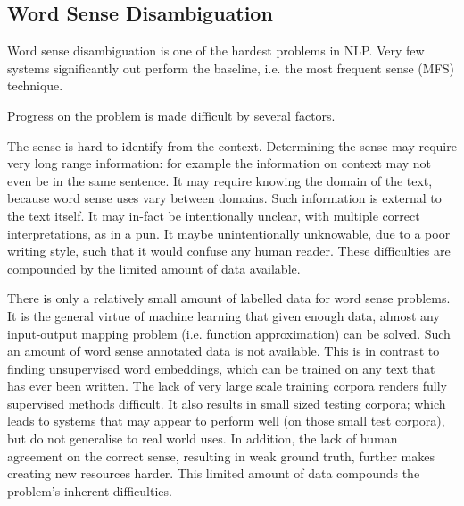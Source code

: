 \documentclass[12pt,parskip]{komatufte}
\begin{document}
\begin{figure}
{}
	
	
\end{figure}



\subsection{Word Sense Disambiguation}
Word sense disambiguation is one of the hardest problems in NLP.
Very few systems significantly out perform the baseline, i.e. the most frequent sense (MFS) technique.

Progress on the problem is made difficult by several factors.

The sense is hard to identify from the context.
Determining the sense may require very long range information:
for example the information on context may not even be in the same sentence.
It may require knowing the domain of the text, because word sense uses vary between domains.
Such information is external to the text itself.
It may in-fact be intentionally unclear, with multiple correct interpretations, as in a pun.
It maybe unintentionally unknowable, due to a poor writing style, such that it would confuse any human reader.
These difficulties are compounded by the limited amount of data available.

There is only a relatively small amount of labelled data for word sense problems.
It is the general virtue of machine learning that given enough data, almost any input-output mapping problem (i.e. function approximation) can be solved.
Such an amount of word sense annotated data is not available.
This is in contrast to finding unsupervised word embeddings, which can be trained on any text that has ever been written.
The lack of very large scale training corpora renders fully supervised methods difficult.
It also results in small sized testing corpora; which leads to systems that may appear to perform well (on those small test corpora), but do not generalise to real world uses.
In addition, the lack of human agreement on the correct sense, resulting in weak ground truth, further makes creating new resources harder.
This limited amount of data compounds the problem's inherent difficulties.
\end{document}
